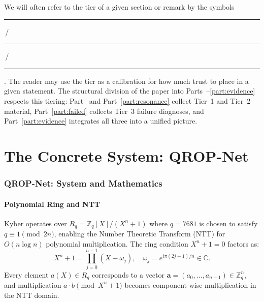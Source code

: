 \documentclass[11pt, a4paper]{article}
\theoremstyle{definition}
\theoremstyle{plain}
\newcommand{\Zq}{\mathbb{Z}_q}
\newcommand{\Rq}{\mathbb{Z}_q[X]/(X^n+1)}
\begin{document}
\noindent We will often refer to the tier of a given section or remark
by the symbols \textcolor{ForestGreen}{\rule{0.9ex}{0.9ex}}\,/
\textcolor{orange}{\rule{0.9ex}{0.9ex}}\,/\textcolor{red}{\rule{0.9ex}{0.9ex}}. The reader may
use the tier as a calibration for how much trust to place in a given
statement. The structural division of the paper into
Parts~\ref{part:qropnet}--\ref{part:evidence} respects this tiering:
Part~\ref{part:qropnet} and Part~\ref{part:resonance} collect Tier~1
and Tier~2 material, Part~\ref{part:failed} collects Tier~3 failure
diagnoses, and Part~\ref{part:evidence} integrates all three into a
unified picture.



\part{The Concrete System: QROP-Net}
\label{part:qropnet}


\section{QROP-Net: System and Mathematics}
\label{sec:qropnet}

\subsection{Polynomial Ring and NTT}

Kyber operates over $R_q = \Rq$ where $q = 7681$ is chosen to satisfy
$q \equiv 1 \pmod{2n}$, enabling the Number Theoretic Transform (NTT)
for $O(n\log n)$ polynomial multiplication. The ring condition
$X^n + 1 = 0$ factors as:
\begin{equation}
  X^n + 1 = \prod_{j=0}^{n-1}(X - \omega_j), \quad
  \omega_j = e^{i\pi(2j+1)/n} \in \mathbb{C}.
  \label{eq:factorisation}
\end{equation}
Every element $a(X) \in R_q$ corresponds to a vector
$\mathbf{a} = (a_0, \ldots, a_{n-1}) \in \Zq^n$, and multiplication
$a \cdot b \pmod{X^n+1}$ becomes component-wise multiplication in the
NTT domain.
\end{document}
